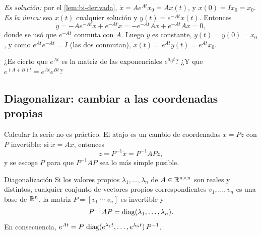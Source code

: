 \begin{demostracion}
\emph{Es solución:} por el \cref{lem:bi-derivada}, $\dot x=Ae^{At}x_0=Ax(t)$, y $x(0)=Ix_0=x_0$.
\emph{Es la única:} sea $x(t)$ cualquier solución y $y(t)=e^{-At}x(t)$. Entonces
\[
  \dot y=-Ae^{-At}x+e^{-At}\dot x=-e^{-At}Ax+e^{-At}Ax=0 ,
\]
donde se usó que $e^{-At}$ conmuta con $A$. Luego $y$ es constante, $y(t)=y(0)=x_0$, y como $e^{At}e^{-At}=I$ (las dos conmutan), $x(t)=e^{At}y(t)=e^{At}x_0$.
\end{demostracion}


\begin{pausa}
¿Es cierto que $e^{At}$ es la matriz de las exponenciales $e^{a_{ij}t}$? ¿Y que $e^{(A+B)t}=e^{At}e^{Bt}$?
\end{pausa}

\subsection{Diagonalizar: cambiar a las coordenadas propias}

Calcular la serie no es práctico. El atajo es un cambio de coordenadas $x=Pz$ con $P$ invertible: si $\dot x=Ax$, entonces
\[
  \dot z=P^{-1}\dot x=P^{-1}APz ,
\]
y se escoge $P$ para que $P^{-1}AP$ sea lo más simple posible.

\begin{teorema}[label=thm:bi-diagonal]{Diagonalización \citep[\S1.2]{Per01}}
Si los valores propios $\lambda_1,\dots,\lambda_n$ de $A\in\mathbb{R}^{n\times n}$ son reales y distintos, cualquier conjunto de vectores propios correspondientes $v_1,\dots,v_n$ es una base de $\mathbb{R}^n$, la matriz $P=[v_1\ \cdots\ v_n]$ es invertible y
\[
  P^{-1}AP=\operatorname{diag}(\lambda_1,\dots,\lambda_n) .
\]
En consecuencia, $e^{At}=P\,\operatorname{diag}(e^{\lambda_1t},\dots,e^{\lambda_nt})\,P^{-1}$.
\end{teorema}

